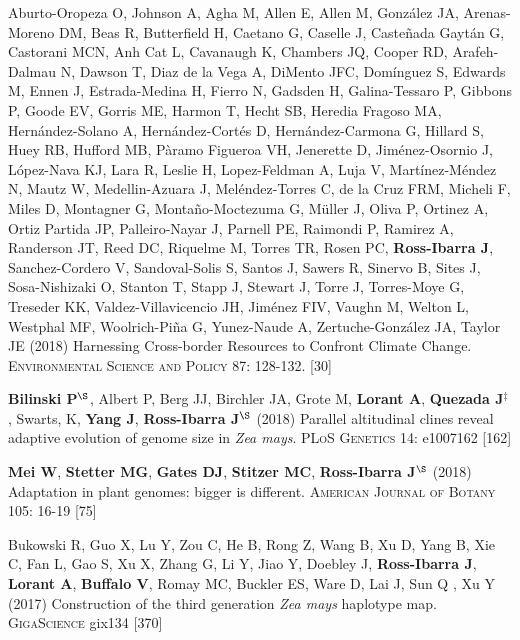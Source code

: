 \documentclass[letterpaper,10pt]{article}
\begin{document}
\begin{etaremune}
\item  Aburto-Oropeza O, Johnson A, Agha M, Allen E,  Allen M,  Gonz\'{a}lez JA, Arenas-Moreno DM, Beas R, Butterfield H, Caetano G, Caselle J, Caste\~{n}ada Gayt\'{a}n G, Castorani MCN, Anh Cat L, Cavanaugh K, Chambers JQ, Cooper RD, Arafeh-Dalmau N, Dawson T, Diaz de la Vega A, DiMento JFC, Dom\'{i}nguez S, Edwards M, Ennen J, Estrada-Medina H, Fierro N, Gadsden H, Galina-Tessaro P, Gibbons P, Goode EV, Gorris ME, Harmon T, Hecht SB, Heredia Fragoso MA, Hern\'{a}ndez-Solano A, Hern\'{a}ndez-Cort\'{e}s D, Hern\'{a}ndez-Carmona G, Hillard S, Huey RB, Hufford MB, P\`{a}ramo Figueroa VH, Jenerette D, Jim\'{e}nez-Osornio J, L\'{o}pez-Nava KJ, Lara R, Leslie H, Lopez-Feldman A, Luja V, Mart\'{i}nez-M\'{e}ndez N, Mautz W, Medellin-Azuara J, Mel\'{e}ndez-Torres C, de la Cruz FRM,  Micheli F, Miles D, Montagner G, Monta\~{n}o-Moctezuma G, M\"{u}ller J, Oliva P, Ortinez A, Ortiz Partida JP, Palleiro-Nayar J, Parnell PE, Raimondi P, Ramirez A, Randerson JT, Reed DC, Riquelme M, Torres TR, Rosen PC, {\bf Ross-Ibarra J}, Sanchez-Cordero V, Sandoval-Solis S, Santos J, Sawers R, Sinervo B, Sites J,  Sosa-Nishizaki O, Stanton T, Stapp J, Stewart J, Torre J,  Torres-Moye G, Treseder KK, Valdez-Villavicencio JH, Jim\'{e}nez FIV, Vaughn M, Welton L, Westphal MF, Woolrich-Pi\~{n}a G,  Yunez-Naude A, Zertuche-Gonz\'{a}lez JA, Taylor JE (2018)
Harnessing Cross-border Resources to Confront Climate Change.  \textsc{Environmental Science and Policy}  87: 128-132.
{} [30]\\

\item \textbf{Bilinski P}$^\S$, Albert P, Berg JJ, Birchler JA, Grote M, \textbf{Lorant A}, \textbf{Quezada J}$^\ddagger$, Swarts, K, \textbf{Yang J}, \textbf{Ross-Ibarra J}$^\S$ (2018) Parallel altitudinal clines reveal adaptive evolution of genome size in \textit{Zea mays}. \textsc{PLoS Genetics} 14: e1007162
{} [162]\\

\item {\bf Mei W}, {\bf Stetter MG}, {\bf Gates DJ}, {\bf Stitzer MC}, {\bf Ross-Ibarra J}$^\S$ (2018) Adaptation in plant genomes: bigger is different.  \textsc{American Journal of Botany} 105: 16-19
{} [75]\\

\item Bukowski R, Guo X, Lu Y, Zou C, He B, Rong Z, Wang B,  Xu D,  Yang B, Xie C,  Fan L, Gao S, Xu X, Zhang G, Li Y, Jiao Y, Doebley J, {\bf Ross-Ibarra J}, {\bf Lorant A}, {\bf Buffalo V}, Romay MC, Buckler ES, Ware D, Lai J, Sun Q , Xu Y (2017) Construction of the third generation \emph{Zea mays} haplotype map. \textsc{GigaScience} gix134
{} [370]\\


\end{etaremune}
\end{document}
